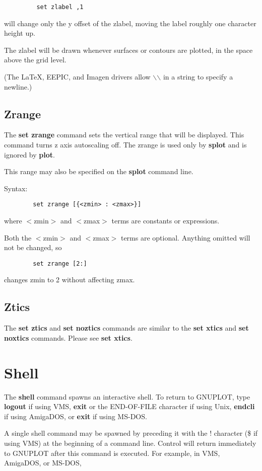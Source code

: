 \begin{verbatim}
         set zlabel ,1
\end{verbatim}

will change only the y offset of the zlabel, moving the label roughly
one character height up.

The zlabel will be drawn whenever surfaces or contours are plotted,
in the space above the grid level.

(The LaTeX, EEPIC, and Imagen drivers allow $\backslash$$\backslash$ in a string to specify
a newline.)
\subsection{Zrange}
The {\bf set zrange} command sets the vertical range that will be
displayed. This command turns z axis autoscaling off.  The zrange is
used only by {\bf splot} and is ignored by {\bf plot}.

This range may also be specified on the {\bf splot} command line.

Syntax:
\begin{verbatim}
        set zrange [{<zmin> : <zmax>}]
\end{verbatim}

where $<$zmin$>$ and $<$zmax$>$ terms are constants or expressions.

Both the $<$zmin$>$ and $<$zmax$>$ terms are optional. Anything omitted will
not be changed, so
\begin{verbatim}
        set zrange [2:]
\end{verbatim}
changes zmin to 2 without affecting zmax.
\subsection{Ztics}
The {\bf set ztics} and {\bf set noztics} commands are similar to the {\bf set
xtics} and {\bf set noxtics} commands. Please see {\bf set xtics}.
\section{Shell}
The {\bf shell} command spawns an interactive shell. To return to
GNUPLOT, type {\bf logout} if using VMS, {\bf exit} or the END-OF-FILE
character if using Unix, {\bf endcli} if using AmigaDOS, or {\bf exit} if
using MS-DOS.

A single shell command may be spawned by preceding it with the !
character (\$ if using VMS) at the beginning of a command line.
Control will return immediately to GNUPLOT after this command is
executed. For example, in VMS, AmigaDOS, or MS-DOS,

